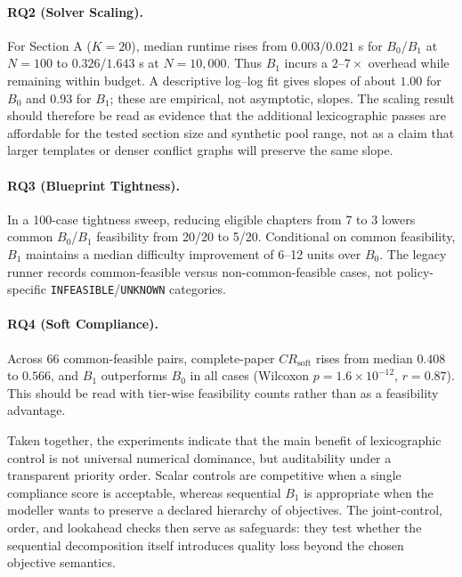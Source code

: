 \documentclass[runningheads]{llncs}
\begin{document}
\paragraph{RQ2 (Solver Scaling).}
For Section A ($K{=}20$), median runtime rises from $0.003$/$0.021$ s for $B_0$/$B_1$ at $N=100$ to $0.326$/$1.643$ s at $N=10{,}000$. Thus $B_1$ incurs a $2$--$7\times$ overhead while remaining within budget. A descriptive log--log fit gives slopes of about $1.00$ for $B_0$ and $0.93$ for $B_1$; these are empirical, not asymptotic, slopes.
The scaling result should therefore be read as evidence that the additional lexicographic passes are affordable for the tested section size and synthetic pool range, not as a claim that larger templates or denser conflict graphs will preserve the same slope.
\paragraph{RQ3 (Blueprint Tightness).}
In a 100-case tightness sweep, reducing eligible chapters from 7 to 3 lowers common $B_0$/$B_1$ feasibility from 20/20 to 5/20. Conditional on common feasibility, $B_1$ maintains a median difficulty improvement of 6--12 units over $B_0$. The legacy runner records common-feasible versus non-common-feasible cases, not policy-specific \texttt{INFEASIBLE}/\texttt{UNKNOWN} categories.
\paragraph{RQ4 (Soft Compliance).}
Across 66 common-feasible pairs, complete-paper $CR_{\mathrm{soft}}$ rises from median $0.408$ to $0.566$, and $B_1$ outperforms $B_0$ in all cases (Wilcoxon $p=1.6{\times}10^{-12}$, $r=0.87$). This should be read with tier-wise feasibility counts rather than as a feasibility advantage.

Taken together, the experiments indicate that the main benefit of lexicographic control is not universal numerical dominance, but auditability under a transparent priority order. Scalar controls are competitive when a single compliance score is acceptable, whereas sequential $B_1$ is appropriate when the modeller wants to preserve a declared hierarchy of objectives. The joint-control, order, and lookahead checks then serve as safeguards: they test whether the sequential decomposition itself introduces quality loss beyond the chosen objective semantics.
\end{document}
